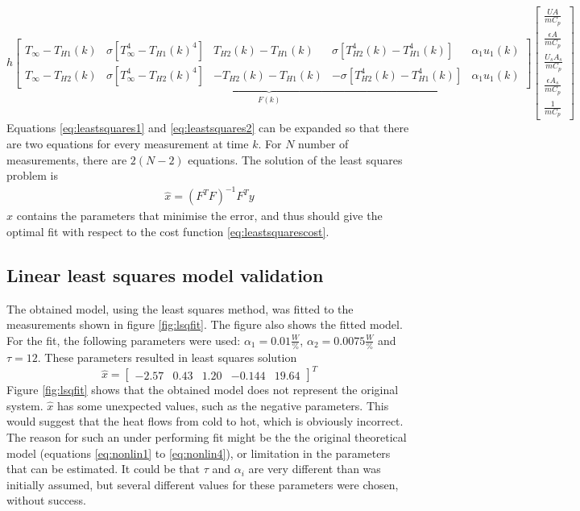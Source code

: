\begin{equation}
        \underbrace{h\begin{bmatrix}
        T_{\infty} - T_{H1}(k) & \sigma[T_{\infty}^4 - T_{H1}(k)^4] & T_{H2}(k) - T_{H1}(k) & \sigma[T_{H2}^4(k) - T_{H1}^4(k)] & \alpha_1 u_1(k)\\
        T_{\infty} - T_{H2}(k) & \sigma[T_{\infty}^4 - T_{H2}(k)^4] & -T_{H2}(k) - T_{H1}(k) & -\sigma[T_{H2}^4(k) - T_{H1}^4(k)] & \alpha_1 u_1(k)       
    \end{bmatrix}}_{F(k)}
    \begin{bmatrix}
    \frac{UA}{mC_p} \\ \frac{\epsilon A}{mC_p} \\ \frac{U_sA_s}{mC_p} \\ \frac{\epsilon A_s}{mC_p} \\ \frac{1}{mC_p} \label{eq:leastsquares2}
    \end{bmatrix}
\end{equation}
Equations \ref{eq:leastsquares1} and \ref{eq:leastsquares2} can be expanded so that there are two equations for every measurement at time $k$. For $N$ number of measurements, there are $2(N-2)$ equations. The solution of the least squares problem is \cite[p.~28--32]{FilteringIdentification}
\begin{align}
    \hat{x} = (F^TF)^{-1}F^Ty
\end{align}
$\hat{x}$ contains the parameters that minimise the error, and thus should give the optimal fit with respect to the cost function \ref{eq:leastsquarescost}.

\subsection{Linear least squares model validation}
The obtained model, using the least squares method, was fitted to the measurements shown in figure \ref{fig:lsqfit}. The figure also shows the fitted model. For the fit, the following parameters were used: $\alpha_1 = 0.01 \frac{W}{\%}$, $\alpha_2 = 0.0075 \frac{W}{\%}$ and $\tau = 12$. These parameters resulted in least squares solution
$$
    \hat{x} = \begin{bmatrix} -2.57 & 0.43 & 1.20 & -0.144 & 19.64\end{bmatrix}^T
$$
Figure \ref{fig:lsqfit} shows that the obtained model does not represent the original system. $\hat{x}$ has some unexpected values, such as the negative parameters. This would suggest that the heat flows from cold to hot, which is obviously incorrect. The reason for such an under performing fit might be the the original theoretical model (equations \ref{eq:nonlin1} to \ref{eq:nonlin4}), or limitation in the parameters that can be estimated. It could be that $\tau$ and $\alpha_i$ are very different than was initially assumed, but several different values for these parameters were chosen, without success.

